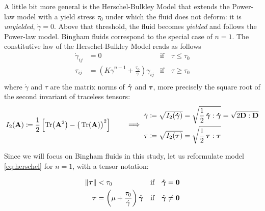 \documentclass[11 pt]{report}
\begin{document}
A little bit more general is the Herschel-Bulkley Model that extends the Power-law model with a yield stress $\tau_0$ under which the fluid does not deform: it is \textit{unyielded}, $\dot\gamma=0$. Above that threshold, the fluid becomes \textit{yielded} and follows the Power-law model. Bingham fluids correspond to the special case of $n=1$. The constitutive law of the Herschel-Bulkley Model reads as follows
\begin{equation}
    \begin{aligned}
        \dot \gamma_{ij} &= 0 & \text{if} \quad \tau \leq \tau_0\\
        \tau_{ij} &= \left(K \dot \gamma^{n-1} + \frac{\tau_0}{\dot \gamma}\right) \gamma_{ij} & \text{if} \quad \tau \geq \tau_0\\
    \end{aligned}
    \label{eq:herschel}
\end{equation}
where $\dot \gamma$ and $\tau$ are the matrix norms of $\boldsymbol{\dot \gamma}$ and $\boldsymbol\tau$, more precisely the square root of the second invariant of traceless tensors:
\begin{align}
    \begin{split}
        I_2(\mathbf{A}) &\coloneqq \frac{1}{2} \left[\Tr(\mathbf{A}^2) - \big(\Tr(\mathbf{A})\big)^2\right]
    \end{split}
    \quad \implies
    \begin{split}
        \dot \gamma &\coloneqq \sqrt{I_2(\boldsymbol{\dot \gamma})} = \sqrt{\frac{1}{2} \, \boldsymbol{\dot \gamma} : \boldsymbol{\dot \gamma}} = \sqrt{2 \mathbf{D} : \mathbf{D}}\\
        \tau &\coloneqq \sqrt{I_2(\boldsymbol\tau)} = \sqrt{\frac{1}{2} \, \boldsymbol\tau : \boldsymbol\tau}
    \end{split}
\end{align}

Since we will focus on Bingham fluids in this study, let us reformulate model \eqref{eq:herschel} for $n=1$, with a tensor notation:
\begin{empheqboxed}
    \begin{align}
        \|\boldsymbol\tau\| &< \tau_0 & \text{if} \quad \boldsymbol{\dot \gamma} = \mathbf{0} \label{eq:tensor_unyielded}\\
        \boldsymbol{\tau} &= \left(\mu + \frac{\tau_0}{\dot \gamma}\right) \boldsymbol{\dot \gamma} & \text{if} \quad  \boldsymbol{\dot \gamma} \neq \mathbf{0} \label{eq:tensor_yielded}
    \end{align}
\end{empheqboxed}
\end{document}
